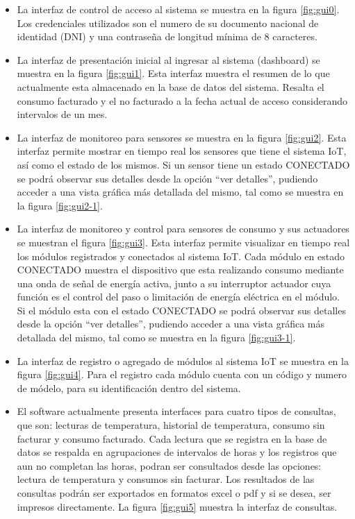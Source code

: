 \begin{itemize}
\item La interfaz de control de acceso al sistema se muestra en la figura \ref{fig:gui0}. Los credenciales utilizados son el numero de su documento nacional de identidad (DNI) y una contraseña de longitud mínima de 8 caracteres.

\item La interfaz de presentación inicial al ingresar al sistema (dashboard) se muestra en la figura \ref{fig:gui1}. Esta interfaz muestra el resumen de lo que actualmente esta almacenado en la base de datos del sistema. Resalta el consumo facturado y el no facturado a la fecha actual de acceso considerando intervalos de un mes.

\item La interfaz de monitoreo para sensores se muestra en la figura \ref{fig:gui2}. Esta interfaz permite mostrar en tiempo real los sensores que tiene el sistema IoT, así como el estado de los mismos. Si un sensor tiene un estado CONECTADO se podrá observar sus detalles desde la opción ``ver detalles'', pudiendo acceder a una vista gráfica más detallada del mismo, tal como se muestra en la figura \ref{fig:gui2-1}.

\item La interfaz de monitoreo y control para sensores de consumo y sus actuadores se muestran el figura \ref{fig:gui3}. Esta interfaz permite visualizar en tiempo real los módulos registrados y conectados al sistema IoT. Cada módulo en estado CONECTADO muestra el dispositivo que esta realizando consumo mediante una onda de señal de energía activa, junto a su interruptor actuador cuya función es el control del paso o limitación de energía eléctrica en el módulo. Si el módulo esta con el estado CONECTADO se podrá observar sus detalles desde la opción ``ver detalles'', pudiendo acceder a una vista gráfica más detallada del mismo, tal como se muestra en la figura \ref{fig:gui3-1}.

\item La interfaz de registro o agregado de módulos al sistema IoT se muestra en la figura \ref{fig:gui4}. Para el registro cada módulo cuenta con un código y numero de módelo, para su identificación dentro del sistema.

\item El software actualmente presenta interfaces para cuatro tipos de consultas, que son: lecturas de temperatura, historial de temperatura, consumo sin facturar y consumo facturado. Cada lectura que se registra en la base de datos se respalda en agrupaciones de intervalos de horas y los registros que aun no completan las horas, podran ser consultados desde las opciones: lectura de temperatura y consumos sin facturar. Los resultados de las consultas podrán ser exportados en formatos excel o pdf y si se desea, ser impresos directamente. La figura \ref{fig:gui5} muestra la interfaz de consultas.


\end{itemize}
